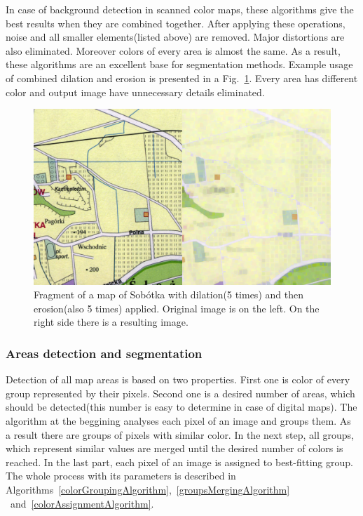 \documentclass[a4paper,onecolumn,oneside,12pt]{memoir}
\begin{document}
In case of background detection in scanned color maps, these algorithms give the best results when
they are combined together. After applying these operations, noise and all smaller elements(listed
above) are removed. Major distortions are also eliminated. Moreover colors of every area is almost
the same. As a result, these algorithms are an excellent base for segmentation methods. Example
usage of combined dilation and erosion is presented in a Fig.~\ref{dilationErosionResult}. Every
area has different color and output image have unnecessary details eliminated.

\begin{figure}[!ht]
\begin{center}
\includegraphics[scale=1.0]{images/dilationErosionResult.png}
\caption{Fragment of a map of Sobótka with dilation(5 times) and then erosion(also 5 times) applied.
Original image is on the left. On the right side there is a resulting image.}
\label{dilationErosionResult}
\end{center}
\end{figure}

\subsubsection{Areas detection and segmentation}

Detection of all map areas is based on two properties. First one is color of every group represented
by their pixels. Second one is a desired number of areas, which should be detected(this number is
easy to determine in case of digital maps). The algorithm at the beggining analyses each pixel of an
image and groups them. As a result there are groups of pixels with similar color. In the next step,
all groups, which represent similar values are merged until the desired number of colors is reached.
In the last part, each pixel of an image is assigned to best-fitting group. The whole process with
its parameters is described in Algorithms~\ref{colorGroupingAlgorithm},~\ref{groupsMergingAlgorithm}
~and~\ref{colorAssignmentAlgorithm}. \\
\end{document}

